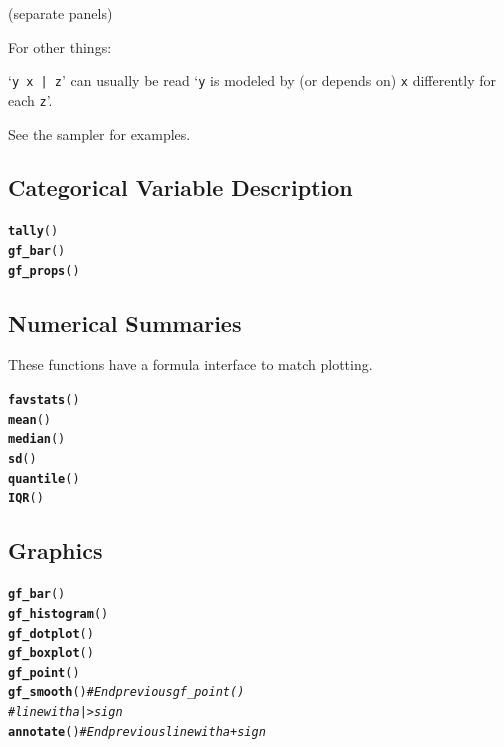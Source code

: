 \documentclass[10pt]{report}\usepackage[]{graphicx}\usepackage[]{xcolor}
\makeatletter
\newcommand{\hlcom}[1]{\textcolor[rgb]{0.678,0.584,0.686}{\textit{#1}}}%
\newcommand{\hldef}[1]{\textcolor[rgb]{0.345,0.345,0.345}{#1}}%
\newcommand{\hlkwd}[1]{\textcolor[rgb]{0.737,0.353,0.396}{\textbf{#1}}}%
\newenvironment{kframe}{%
 \def\at@end@of@kframe{}%
 \ifinner\ifhmode%
  \def\at@end@of@kframe{\end{minipage}}%
  \begin{minipage}{\columnwidth}%
 \fi\fi%
 \def\FrameCommand##1{\hskip\@totalleftmargin \hskip-\fboxsep
 \colorbox{shadecolor}{##1}\hskip-\fboxsep
     \hskip-\linewidth \hskip-\@totalleftmargin \hskip\columnwidth}%
 \MakeFramed {\advance\hsize-\width
   \@totalleftmargin\z@ \linewidth\hsize
   \@setminipage}}%
 {\par\unskip\endMakeFramed%
 \at@end@of@kframe}
\newenvironment{knitrout}{}{} %
\providecommand{\code}[1]{}
\renewcommand{\code}[1]{{\color{blue!80!black}\texttt{#1}}}
\newcommand{\twiddle}{\raisebox{0.5ex}{\texttildelow}}
\makeatother
\begin{document}
\begin{multicols}{3}
\begin{itemize}
		(separate panels)
\end{itemize}
For other things:
\medskip

`\code{y \twiddle{} x | z}' can usually be
read `\code{y} is modeled by (or depends on) \code{x} 
differently for each \code{z}'.
\medskip

See the sampler for examples.

\subsection*{Categorical Variable Description}

\begin{knitrout}
\color{fgcolor}\begin{kframe}
\begin{alltt}
\hlkwd{tally}\hldef{()}
\hlkwd{gf_bar}\hldef{()}
\hlkwd{gf_props}\hldef{()}
\end{alltt}
\end{kframe}
\end{knitrout}



\subsection*{Numerical Summaries}
These functions have 
a formula interface to match plotting.
%
\begin{knitrout}
\color{fgcolor}\begin{kframe}
\begin{alltt}
\hlkwd{favstats}\hldef{()}
\hlkwd{mean}\hldef{()}
\hlkwd{median}\hldef{()}
\hlkwd{sd}\hldef{()}
\hlkwd{quantile}\hldef{()}
\hlkwd{IQR}\hldef{()}
\end{alltt}
\end{kframe}
\end{knitrout}

\subsection*{Graphics}



\begin{knitrout}
\color{fgcolor}\begin{kframe}
\begin{alltt}
\hlkwd{gf_bar}\hldef{()}
\hlkwd{gf_histogram}\hldef{()}
\hlkwd{gf_dotplot}\hldef{()}
\hlkwd{gf_boxplot}\hldef{()}
\hlkwd{gf_point}\hldef{()}
\hlkwd{gf_smooth}\hldef{()}  \hlcom{# End previous gf_point()}
             \hlcom{# line with a  |>  sign}
\hlkwd{annotate}\hldef{()}   \hlcom{# End previous line with a + sign}
\end{alltt}
\end{kframe}
\end{knitrout}
\squeeze


\end{multicols}
\end{document}
